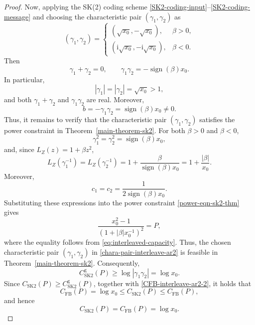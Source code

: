 \documentclass[10pt,a4paper]{amsart}
\begin{document}
\begin{proof}
Now, applying the SK(2) coding scheme \eqref{SK2-coding-input}--\eqref{SK2-coding-message} and choosing the characteristic pair $(\gamma_1,\gamma_2)$ as
\begin{equation}\label{chara-pair-interleave-ar2}
(\gamma_1,\gamma_2) =
\begin{cases}
\left(\sqrt{x_0},-\sqrt{x_0}\right), & \beta>0,\\[1mm]
\left(\mathrm{i}\sqrt{x_0},-\mathrm{i}\sqrt{x_0}\right), & \beta<0.
\end{cases}
\end{equation}
Then
$$
\gamma_1+\gamma_2=0, \qquad \gamma_1\gamma_2=-\operatorname{sign}(\beta)x_0.
$$
In particular, 
$$
|\gamma_1|=|\gamma_2| = \sqrt{x_0}>1,
$$
and both $\gamma_1+\gamma_2$ and $\gamma_1\gamma_2$ are real. Moreover, 
$$
b = -\gamma_1\gamma_2=\operatorname{sign}(\beta)x_0\neq 0.
$$
Thus, it remains to verify that the characteristic pair $(\gamma_1,\gamma_2)$ satisfies the power constraint in Theorem~\ref{main-theorem-sk2}.
For both $\beta>0$ and $\beta<0$, 
$$
\gamma_1^2=\gamma_2^2=\operatorname{sign}(\beta) x_0,
$$
and, since $L_Z(z)=1+\beta z^2$,
$$
L_Z(\gamma_1^{-1})=L_Z(\gamma_2^{-1}) = 1 +\frac{\beta}{\operatorname{sign}(\beta) x_0}=1 +\frac{|\beta|}{ x_0}.
$$
Moreover,
$$
c_1=c_2=\frac{1}{2\operatorname{sign}(\beta) x_0}.
$$
Substituting these expressions into the power constraint \eqref{power-eqn-sk2-thm} gives
$$
\frac{x_0^2-1}{(1 +|\beta| x^{-1}_0)^2}=P,
$$
where the equality follows from \eqref{eq:interleaved-capacity}. Thus, the chosen characteristic pair $(\gamma_1,\gamma_2)$ in \eqref{chara-pair-interleave-ar2} is feasible in Theorem~\ref{main-theorem-sk2}. Consequently,
$$
C^\mathrm{g}_\mathrm{SK2}(P)\ge \log|\gamma_1\gamma_2|=\log x_0.
$$
Since $C_\mathrm{SK2}(P)\ge C^\mathrm{g}_\mathrm{SK2}(P)$, together with \eqref{CFB-interleave-ar2-2}, it holds that
$$
 C_{\mathrm{FB}}(P)=\log x_0 \le C_{\mathrm{SK2}}(P) \le C_{\mathrm{FB}}(P),
$$
and hence
\begin{equation}\label{CSK2-CFB-AR2-Inter}
C_\mathrm{SK2}(P)=C_\mathrm{FB}(P) = \log x_0.
\end{equation}


\end{proof}
\end{document}
